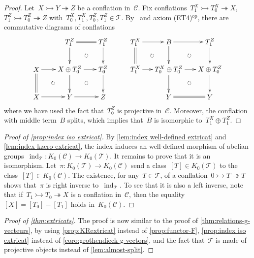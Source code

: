 \documentclass{amsart}
\theoremstyle{definition}
\newcommand{\cat}{\mathcal{C}}
\newcommand{\ind}{\operatorname{ind}}
\newcommand{\tc}{\mathcal{T}}
\newcommand{\infl}{\rightarrowtail}
\newcommand{\defl}{\twoheadrightarrow}
\newcommand{\kzero}[1]{K_0(#1)}
\begin{document}
\begin{proof}
Let~$X\infl Y\defl Z$ be a conflation in~$\cat$.
Fix conflations~$T_1^X \infl T_0^X \defl X$,~$T_1^Z\infl T_0^Z \defl Z$ with~$T_0^X, T_1^X, T_0^Z, T_1^Z\in\tc$.
By~\cite[Prop.~3.15]{NakaokaPalu} and axiom (ET4)$^{\mathrm{op}}$, there are commutative diagrams of conflations
\[
\xy
%
(-7,21)*+{T^Z_1}="-12";
(10,21)*+{T^Z_1}="-14";
%
(-24,7)*+{X}="0";
(-7,7)*+{X\oplus T^Z_0}="2";
(10,7)*+{T^Z_0}="4";
%
(-24,-7)*+{X}="10";
(-7,-7)*+{Y}="12";
(10,-7)*+{Z}="14";
%
{\ar@{=} "-12";"-14"};
%
{\ar "-12";"2"};
{\ar "-14";"4"};
%
{\ar "0";"2"};
{\ar "2";"4"};
%
{\ar@{=} "0";"10"};
{\ar "2";"12"};
{\ar "4";"14"};
%
{\ar "10";"12"};
{\ar "12";"14"};
%
{\ar@{}|\circlearrowright "-12";"4"};
{\ar@{}|\circlearrowright "0";"12"};
{\ar@{}|\circlearrowright "2";"14"};
\endxy
\quad \quad \ \
\xy
(-24,21)*+{T^X_1}="0";
(-7,21)*+{B}="2";
(14,21)*+{T^Z_1}="4";
%
(-24,7)*+{T^X_1}="10";
(-7,7)*+{T^X_0\oplus T^Z_0}="12";
(14,7)*+{X\oplus T^Z_0}="14";
%
(-7,-7)*+{Y}="22";
(14,-7)*+{Y}="24";
%
%
{\ar "0";"2"};
{\ar "2";"4"};
%
{\ar@{=} "0";"10"};
{\ar "2";"12"};
{\ar "4";"14"};
%
{\ar "10";"12"};
{\ar "12";"14"};
%
{\ar "12";"22"};
{\ar "14";"24"};
%
{\ar@{=} "22";"24"};
%
{\ar@{}|\circlearrowright "0";"12"};
{\ar@{}|\circlearrowright "2";"14"};
{\ar@{}|\circlearrowright "12";"24"};
\endxy
\]
where we have used the fact that~$T_0^Z$ is projective in~$\cat$.
Moreover, the conflation with middle term~$B$ splits, which implies that~$B$ is isomorphic to~$T_1^X\oplus T_1^Z$.
\end{proof}

\begin{proof}[Proof of \cref{prop:index iso extricat}]
By \cref{lem:index well-defined extricat} and \cref{lem:index kzero extricat}, the index induces an well-defined morphism of abelian groups~$\ind_\tc:\kzero{\cat}\to\kzero{\tc}$.
It remains to prove that it is an isomorphism.
Let~$\pi:\kzero{\tc}\to\kzero{\cat}$ send a class~$[T]\in\kzero{\tc}$ to the class~$[T]\in\kzero{\cat}$.
The existence, for any~$T\in\tc$, of a conflation~$0\infl T\defl T$ shows that~$\pi$ is right inverse to~$\ind_\tc$.
To see that it is also a left inverse, note that if~$T_1\infl T_0\defl X$ is a conflation in~$\cat$, then the equality~$[X]=[T_0]-[T_1]$ holds in~$\kzero{\cat}$.
\end{proof}

\begin{proof}[Proof of \cref{thm:extricats}]
The proof is now similar to the proof of \cref{thm:relations-g-vecteurs}, by using \cref{prop:KRextricat} instead of \cref{prop:functor-F}, \cref{prop:index iso extricat} instead of \cref{coro:grothendieck-g-vectors}, and the fact that~$\tc$ is made of projective objects instead of \cref{lem:almost-split}.
\end{proof}
\end{document}
